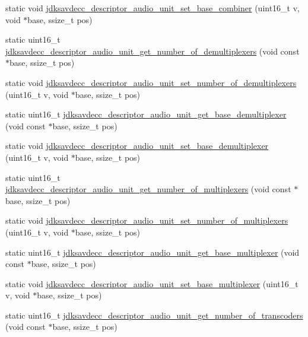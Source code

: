 \begin{DoxyCompactItemize}
\item 
static void \hyperlink{group__descriptor__audio_ga6b858707c0a7588c322db0e8dd8e6855}{jdksavdecc\+\_\+descriptor\+\_\+audio\+\_\+unit\+\_\+set\+\_\+base\+\_\+combiner} (uint16\+\_\+t v, void $\ast$base, ssize\+\_\+t pos)
\item 
static uint16\+\_\+t \hyperlink{group__descriptor__audio_gae1a89741644481a0fa60583f7ec7be4a}{jdksavdecc\+\_\+descriptor\+\_\+audio\+\_\+unit\+\_\+get\+\_\+number\+\_\+of\+\_\+demultiplexers} (void const $\ast$base, ssize\+\_\+t pos)
\item 
static void \hyperlink{group__descriptor__audio_gacdb038d8b3375ff4d4e9e8ec9124fbe9}{jdksavdecc\+\_\+descriptor\+\_\+audio\+\_\+unit\+\_\+set\+\_\+number\+\_\+of\+\_\+demultiplexers} (uint16\+\_\+t v, void $\ast$base, ssize\+\_\+t pos)
\item 
static uint16\+\_\+t \hyperlink{group__descriptor__audio_gae0c583b986c799ad31387680bfc0a41d}{jdksavdecc\+\_\+descriptor\+\_\+audio\+\_\+unit\+\_\+get\+\_\+base\+\_\+demultiplexer} (void const $\ast$base, ssize\+\_\+t pos)
\item 
static void \hyperlink{group__descriptor__audio_ga4f5b8dbebba11a4447c11c1dd8344236}{jdksavdecc\+\_\+descriptor\+\_\+audio\+\_\+unit\+\_\+set\+\_\+base\+\_\+demultiplexer} (uint16\+\_\+t v, void $\ast$base, ssize\+\_\+t pos)
\item 
static uint16\+\_\+t \hyperlink{group__descriptor__audio_ga61736bd58ff4caeb688cc4b52c4e178a}{jdksavdecc\+\_\+descriptor\+\_\+audio\+\_\+unit\+\_\+get\+\_\+number\+\_\+of\+\_\+multiplexers} (void const $\ast$base, ssize\+\_\+t pos)
\item 
static void \hyperlink{group__descriptor__audio_ga596b59bc373ec55738ee63c83b6164b2}{jdksavdecc\+\_\+descriptor\+\_\+audio\+\_\+unit\+\_\+set\+\_\+number\+\_\+of\+\_\+multiplexers} (uint16\+\_\+t v, void $\ast$base, ssize\+\_\+t pos)
\item 
static uint16\+\_\+t \hyperlink{group__descriptor__audio_ga2717be054162a54c60af428f076b6845}{jdksavdecc\+\_\+descriptor\+\_\+audio\+\_\+unit\+\_\+get\+\_\+base\+\_\+multiplexer} (void const $\ast$base, ssize\+\_\+t pos)
\item 
static void \hyperlink{group__descriptor__audio_gad1bc05f36654ecedd71223a499204aa7}{jdksavdecc\+\_\+descriptor\+\_\+audio\+\_\+unit\+\_\+set\+\_\+base\+\_\+multiplexer} (uint16\+\_\+t v, void $\ast$base, ssize\+\_\+t pos)
\item 
static uint16\+\_\+t \hyperlink{group__descriptor__audio_gaf4f033db7a41cd05cc30c3227d5ee48c}{jdksavdecc\+\_\+descriptor\+\_\+audio\+\_\+unit\+\_\+get\+\_\+number\+\_\+of\+\_\+transcoders} (void const $\ast$base, ssize\+\_\+t pos)

\end{DoxyCompactItemize}
